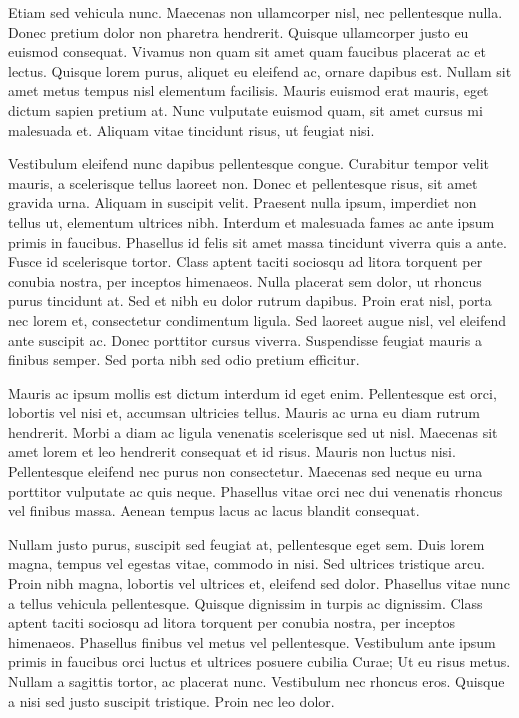 Etiam sed vehicula nunc. Maecenas non ullamcorper nisl, nec pellentesque nulla. Donec pretium dolor non pharetra hendrerit. Quisque ullamcorper justo eu euismod consequat. Vivamus non quam sit amet quam faucibus placerat ac et lectus. Quisque lorem purus, aliquet eu eleifend ac, ornare dapibus est. Nullam sit amet metus tempus nisl elementum facilisis. Mauris euismod erat mauris, eget dictum sapien pretium at. Nunc vulputate euismod quam, sit amet cursus mi malesuada et. Aliquam vitae tincidunt risus, ut feugiat nisi.

Vestibulum eleifend nunc dapibus pellentesque congue. Curabitur tempor velit mauris, a scelerisque tellus laoreet non. Donec et pellentesque risus, sit amet gravida urna. Aliquam in suscipit velit. Praesent nulla ipsum, imperdiet non tellus ut, elementum ultrices nibh. Interdum et malesuada fames ac ante ipsum primis in faucibus. Phasellus id felis sit amet massa tincidunt viverra quis a ante. Fusce id scelerisque tortor. Class aptent taciti sociosqu ad litora torquent per conubia nostra, per inceptos himenaeos. Nulla placerat sem dolor, ut rhoncus purus tincidunt at. Sed et nibh eu dolor rutrum dapibus. Proin erat nisl, porta nec lorem et, consectetur condimentum ligula. Sed laoreet augue nisl, vel eleifend ante suscipit ac. Donec porttitor cursus viverra. Suspendisse feugiat mauris a finibus semper. Sed porta nibh sed odio pretium efficitur.

Mauris ac ipsum mollis est dictum interdum id eget enim. Pellentesque est orci, lobortis vel nisi et, accumsan ultricies tellus. Mauris ac urna eu diam rutrum hendrerit. Morbi a diam ac ligula venenatis scelerisque sed ut nisl. Maecenas sit amet lorem et leo hendrerit consequat et id risus. Mauris non luctus nisi. Pellentesque eleifend nec purus non consectetur. Maecenas sed neque eu urna porttitor vulputate ac quis neque. Phasellus vitae orci nec dui venenatis rhoncus vel finibus massa. Aenean tempus lacus ac lacus blandit consequat.

Nullam justo purus, suscipit sed feugiat at, pellentesque eget sem. Duis lorem magna, tempus vel egestas vitae, commodo in nisi. Sed ultrices tristique arcu. Proin nibh magna, lobortis vel ultrices et, eleifend sed dolor. Phasellus vitae nunc a tellus vehicula pellentesque. Quisque dignissim in turpis ac dignissim. Class aptent taciti sociosqu ad litora torquent per conubia nostra, per inceptos himenaeos. Phasellus finibus vel metus vel pellentesque. Vestibulum ante ipsum primis in faucibus orci luctus et ultrices posuere cubilia Curae; Ut eu risus metus. Nullam a sagittis tortor, ac placerat nunc. Vestibulum nec rhoncus eros. Quisque a nisi sed justo suscipit tristique. Proin nec leo dolor.

